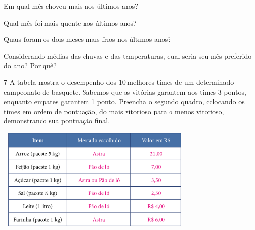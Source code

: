 \begin{escolha}
\item Em qual mês choveu mais nos últimos anos?


\item Qual mês foi mais quente nos últimos anos?


\item Quais foram os dois meses mais frios nos últimos anos?


\item Considerando médias das chuvas e das temperaturas, qual seria seu mês preferido do ano? Por quê?


\begin{escolha}

\num{7} A tabela mostra o desempenho dos 10 melhores times de um
determinado campeonato de basquete. Sabemos que as vitórias garantem aos
times 3 pontos, enquanto empates garantem 1 ponto. Preencha o segundo quadro,
colocando os times em ordem de pontuação, do mais vitorioso para o menos
vitorioso, demonstrando sua pontuação final.


\includegraphics[width=3.83333in,height=1.97257in]{media/image93.png}


\end{escolha}
\end{escolha}
